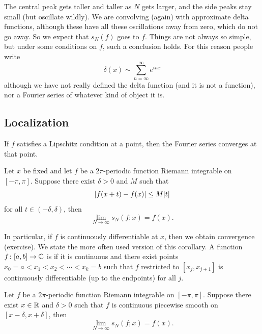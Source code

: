 The central peak gets taller and taller as $N$ gets larger,
and the side peaks stay small (but oscillate wildly).
We are convolving (again) with approximate delta functions,
although these have
all these oscillations away from zero, which do not go away.  So we expect that
$s_N(f)$ goes to $f$.  Things are not always so simple,
but under some conditions on $f$, such a conclusion holds.  For this reason
people write
\begin{equation*}
\delta(x) \sim \sum_{n=\infty}^\infty e^{inx}
\end{equation*}
although we have not really defined the delta function (and it is not a
function), nor a Fourier series of whatever kind of object it is.

\subsection{Localization}

If $f$ satisfies a Lipschitz condition at a point, then
the Fourier series converges at that point.

\begin{thm} \label{thm:fourierlocalization}
Let $x$ be fixed and let $f$ be a $2\pi$-periodic function
Riemann integrable on $[-\pi,\pi]$.  Suppose
there exist $\delta > 0$ and $M$ such that
\begin{equation*}
\lvert {f(x+t)-f(x)} \rvert \leq M \lvert {t} \rvert
\end{equation*}
for all $t \in (-\delta,\delta)$, then
\begin{equation*}
\lim_{N \to \infty} s_N(f;x) = f(x) .
\end{equation*}
\end{thm}

In particular,
if $f$ is continuously
differentiable at $x$,
then we obtain convergence (exercise).
We state the more often used version of this corollary.
A function $f \colon [a,b] \to {\mathbb{C}}$ is
\emph{}
if it is continuous and there exist points
$x_0 = a < x_1 < x_2 < \cdots < x_k = b$
such that $f$ restricted to $[x_j,x_{j+1}]$
is continuously differentiable (up to the endpoints) for all $j$.

\begin{cor} \label{cor:fourierpiecewisesmooth}
Let $f$ be a $2\pi$-periodic function
Riemann integrable on $[-\pi,\pi]$.  Suppose
there exist $x\in {\mathbb{R}}$ and $\delta > 0$ such that $f$ is continuous piecewise
smooth on $[x-\delta,x+\delta]$, then
\begin{equation*}
\lim_{N \to \infty} s_N(f;x) = f(x) .
\end{equation*}
\end{cor}


